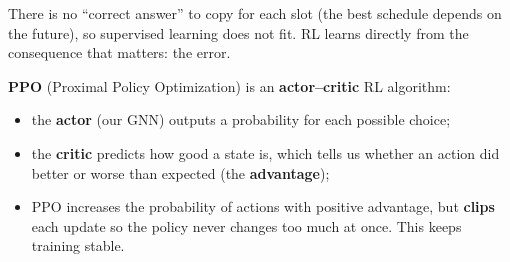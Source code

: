 There is no ``correct answer'' to copy for each slot (the best schedule depends on the future), so supervised
learning does not fit. RL learns directly from the consequence that matters: the error.

\textbf{PPO} (Proximal Policy Optimization) \cite{23} is an \textbf{actor--critic} RL algorithm:
\begin{itemize}
  \item the \textbf{actor} (our GNN) outputs a probability for each possible choice;
  \item the \textbf{critic} predicts how good a state is, which tells us whether an action did better or worse than
        expected (the \textbf{advantage});
  \item PPO increases the probability of actions with positive advantage, but \textbf{clips} each update so the
        policy never changes too much at once. This keeps training stable.
\end{itemize}
